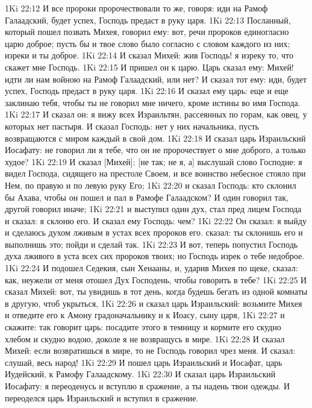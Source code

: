\vs 1Ki 22:12 И все пророки пророчествовали то же, говоря: иди на Рамоф Галаадский, будет успех, Господь предаст  в руку царя.
\vs 1Ki 22:13 Посланный, который пошел позвать Михея, говорил ему: вот, речи пророков единогласно  царю доброе; пусть бы и твое слово было согласно с словом каждого из них; изреки и ты доброе.
\vs 1Ki 22:14 И сказал Михей: жив Господь! я изреку то, что скажет мне Господь.
\vs 1Ki 22:15 И пришел он к царю. Царь сказал ему: Михей! идти ли нам войною на Рамоф Галаадский, или нет? И сказал тот ему: иди, будет успех, Господь предаст  в руку царя.
\vs 1Ki 22:16 И сказал ему царь: еще и еще заклинаю тебя, чтобы ты не говорил мне ничего, кроме истины во имя Господа.
\vs 1Ki 22:17 И сказал он: я вижу всех Израильтян, рассеянных по горам, как овец, у которых нет пастыря. И сказал Господь: нет у них начальника, пусть возвращаются с миром каждый в свой дом.
\vs 1Ki 22:18 И сказал царь Израильский Иосафату: не говорил ли я тебе, что он не пророчествует о мне доброго, а только худое?
\vs 1Ki 22:19 И сказал [Михей]: [не так; не я, а] выслушай слово Господне: я видел Господа, сидящего на престоле Своем, и все воинство небесное стояло при Нем, по правую и по левую руку Его;
\vs 1Ki 22:20 и сказал Господь: кто склонил бы Ахава, чтобы он пошел и пал в Рамофе Галаадском? И один говорил так, другой говорил иначе;
\vs 1Ki 22:21 и выступил один дух, стал пред лицем Господа и сказал: я склоню его. И сказал ему Господь: чем?
\vs 1Ki 22:22 Он сказал: я выйду и сделаюсь духом лживым в устах всех пророков его.  сказал: ты склонишь его и выполнишь это; пойди и сделай так.
\vs 1Ki 22:23 И вот, теперь попустил Господь духа лживого в уста всех сих пророков твоих; но Господь изрек о тебе недоброе.
\vs 1Ki 22:24 И подошел Седекия, сын Хенааны, и, ударив Михея по щеке, сказал: как, неужели от меня отошел Дух Господень, чтобы говорить в тебе?
\vs 1Ki 22:25 И сказал Михей: вот, ты увидишь  в тот день, когда будешь бегать из одной комнаты в другую, чтоб укрыться,
\vs 1Ki 22:26 и сказал царь Израильский: возьмите Михея и отведите его к Амону градоначальнику и к Иоасу, сыну царя,
\vs 1Ki 22:27 и скажите: так говорит царь: посадите этого в темницу и кормите его скудно хлебом и скудно водою, доколе я не возвращусь в мире.
\vs 1Ki 22:28 И сказал Михей: если возвратишься в мире, то не Господь говорил чрез меня. И сказал: слушай, весь народ!
\rsbpar\vs 1Ki 22:29 И пошел царь Израильский и Иосафат, царь Иудейский, к Рамофу Галаадскому.
\vs 1Ki 22:30 И сказал царь Израильский Иосафату: я переоденусь и вступлю в сражение, а ты надень твои  одежды. И переоделся царь Израильский и вступил в сражение.
